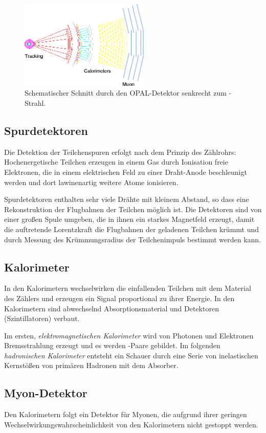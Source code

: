 \begin{figure}[H]
    \begin{center}
        \includegraphics[width=0.55\textwidth]{../img/opalslice_tr.png}
        \caption{Schematischer Schnitt durch den OPAL-Detektor senkrecht zum \mbox{\ee-Strahl}\protect\footnotemark.}
        \label{img:schnitt}
    \end{center}
\end{figure}

\subsection*{Spurdetektoren}
Die Detektion der Teilchenspuren erfolgt nach dem Prinzip des Zählrohrs:
Hochenergetische Teilchen erzeugen in einem Gas durch Ionisation freie Elektronen,
die in einem elektrischen Feld zu einer Draht-Anode beschleunigt werden und
dort lawinenartig weitere Atome ionisieren.

Spurdetektoren enthalten sehr viele Drähte mit kleinem Abstand,
so dass eine Rekonstruktion der Flugbahnen der Teilchen möglich ist.
Die Detektoren sind von einer großen Spule umgeben,
die in ihnen ein starkes Magnetfeld erzeugt,
damit die auftretende Lorentzkraft die Flugbahnen der geladenen Teilchen krümmt
und durch Messung des Krümmungsradius der Teilchenimpuls bestimmt werden kann.

\subsection*{Kalorimeter}
In den Kalorimetern wechselwirken die einfallenden Teilchen mit dem Material des Zählers
und erzeugen ein Signal proportional zu ihrer Energie.
In den Kalorimetern sind abwechselnd Absorptionsmaterial und Detektoren (Szintillatoren) verbaut.

Im ersten, \emph{elektromagnetischen Kalorimeter} wird von Photonen und Elektronen Brems\-strah\-lung erzeugt
und es werden \mbox{\ee-Paare} gebildet.
Im folgenden \emph{hadronischen Kalorimeter} entsteht ein Schauer durch eine Serie von inelastischen Kernstößen
von primären Hadronen mit dem Absorber.

\subsection*{Myon-Detektor}
Den Kalorimetern folgt ein Detektor für Myonen, die aufgrund ihrer geringen Wechselwirkungswahrscheinlichkeit
von den Kalorimetern nicht gestoppt werden.

